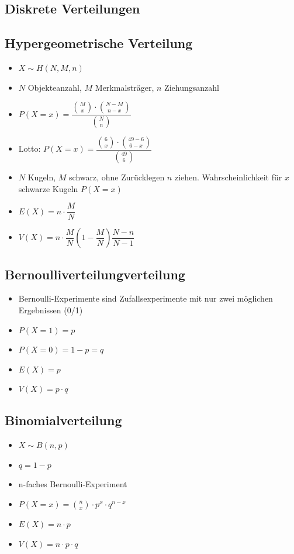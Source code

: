 \documentclass[8pt,a4paper]{scrartcl}
\begin{document}
\begin{multicols*}{3}
		\section{Diskrete Verteilungen}
			
			\subsection{Hypergeometrische Verteilung}
				\begin{itemize}\itemsep0pt			
					\item $X \sim H(N,M,n)$
					\item $N$ Objekteanzahl, $M$ Merkmalsträger, $n$ Ziehungsanzahl
					\item $P(X=x)=\dfrac{{M\choose x} \cdot {N-M\choose n-x}}{{N\choose n} }$
					\item Lotto: $P(X=x)=\dfrac{{6\choose x} \cdot {49-6\choose 6-x}}{{49\choose 6} }$
					\item $N$ Kugeln, $M$ schwarz, ohne Zurücklegen $n$ ziehen. Wahrscheinlichkeit für $x$ schwarze Kugeln $P(X=x)$
					\item $E(X) = n \cdot \dfrac{M}{N}$
					\item $V(X) = n \cdot \dfrac{M}{N} (1-\dfrac{M}{N})\dfrac{N-n}{N-1}$
				\end{itemize}	
			
			\subsection{Bernoulliverteilungverteilung}
				\begin{itemize}\itemsep0pt				
					\item Bernoulli-Experimente sind Zufallsexperimente mit nur zwei möglichen Ergebnissen (0/1)
					\item $P(X=1)=p$
					\item $P(X=0)=1-p=q$
					\item $E(X)=p$
					\item $V(X)=p\cdot q$
				\end{itemize}	
			
			\subsection{Binomialverteilung}
				\begin{itemize}\itemsep0pt				
					\item $X \sim B(n,p)$
					\item $q = 1-p$
					\item n-faches Bernoulli-Experiment
					\item $P(X=x)={n\choose x} \cdot p^{x} \cdot q^{n-x} $
					\item $E(X)=n\cdot p$
					\item $V(X)=n\cdot p\cdot q$
				\end{itemize}	
				

\end{multicols*}
\end{document}
